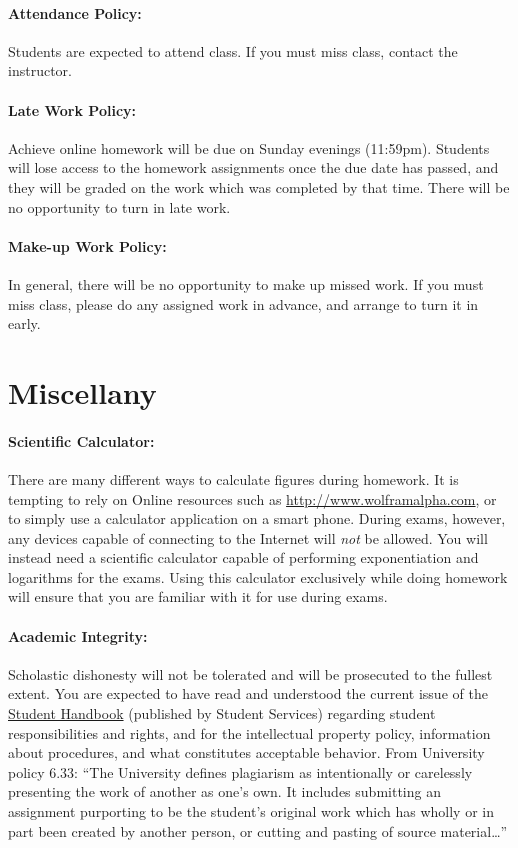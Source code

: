 \documentclass[12pt, letterpaper]{article}
\begin{document}
\paragraph{Attendance Policy:}
Students are expected to attend class. If you must miss class, contact the instructor.

\paragraph{Late Work Policy:}
Achieve online homework will be due on Sunday evenings (11:59pm). Students will lose access to the homework assignments once the due date has passed, and they will be graded on the work which was completed by that time. There will be no opportunity to turn in late work.

\paragraph{Make-up Work Policy:}
In general, there will be no opportunity to make up missed work. If you must miss class, please do any assigned work in advance, and arrange to turn it in early.

\section*{Miscellany}

\paragraph{Scientific Calculator:}
There are many different ways to calculate figures during homework. It is tempting to rely on Online resources such as \href{http://www.wolframalpha.com}{http://www.wolframalpha.com}, or to simply use a calculator application on a smart phone. During exams, however, any devices capable of connecting to the Internet will \emph{not} be allowed. You will instead need a scientific calculator capable of performing exponentiation and logarithms for the exams. Using this calculator exclusively while doing homework will ensure that you are familiar with it for use during exams.

\paragraph{Academic Integrity:}
Scholastic dishonesty will not be tolerated and will be prosecuted to the fullest extent. You are expected to have read and understood the current issue of the \href{https://help.suu.edu/handbook}{Student Handbook} (published by Student Services) regarding student responsibilities and rights, and for the intellectual property policy, information about procedures, and what constitutes acceptable behavior. From University policy 6.33: ``The University defines plagiarism as intentionally or carelessly presenting the work of another as one’s own. It includes submitting an assignment purporting to be the student’s original work which has wholly or in part been created by another person, or cutting and pasting of source material\ldots''
\end{document}
